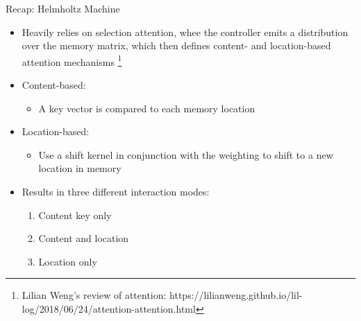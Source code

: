 \documentclass[AERbeamer%
              ,optEnglish%
              ,optBiber%
              ,optBibstyleAlphabetic%
              ,optBeamerClassicFormat%
              ]{AERlatex}%
\begin{document}
\begin{frame}[c]{Recap: Helmholtz Machine}
    \centering
    \begin{itemize}
        \item Heavily relies on selection attention, whee the controller emits a distribution over the memory matrix,
              which then defines content- and location-based attention mechanisms \footnote{Lilian Weng's review of attention: https://lilianweng.github.io/lil-log/2018/06/24/attention-attention.html}
        \item Content-based:
        \begin{itemize}
            \item A key vector is compared to each memory location
        \end{itemize}
        \item Location-based:
        \begin{itemize}
            \item Use a shift kernel in conjunction with the weighting to shift to a new location in memory
        \end{itemize}
        \item Results in three different interaction modes:
        \begin{enumerate}
            \item Content key only
            \item Content and location
            \item Location only
        \end{enumerate}
    \end{itemize}
\end{frame}
\end{document}
